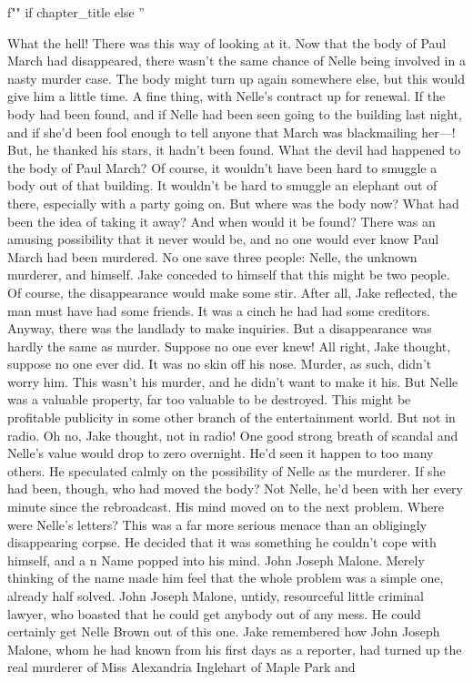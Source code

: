 \documentclass{novel}
\begin{document}
\begin{ChapterStart}
\vspace{3\nbs}
f"" if chapter_title else ''
\end{ChapterStart}

What the hell! There was this way of looking at it. Now that the body of Paul March had disappeared, there wasn’t the same chance of Nelle being involved in a nasty murder case. The body might turn up again somewhere else, but this would give him a little time. A fine thing, with Nelle’s contract up for renewal. If the body had been found, and if Nelle had been seen going to the building last night, and if she’d been fool enough to tell anyone that March was blackmailing her—! But, he thanked his stars, it hadn’t been found. What the devil had happened to the body of Paul March? Of course, it wouldn’t have been hard to smuggle a body out of that building. It wouldn’t be hard to smuggle an elephant out of there, especially with a party going on. But where was the body now? What had been the idea of taking it away? And when would it be found? There was an amusing possibility that it never would be, and no one would ever know Paul March had been murdered. No one save three people: Nelle, the unknown murderer, and himself. Jake conceded to himself that this might be two people. Of course, the disappearance would make some stir. After all, Jake reflected, the man must have had some friends. It was a cinch he had had some creditors. Anyway, there was the landlady to make inquiries. But a disappearance was hardly the same as murder. Suppose no one ever knew! All right, Jake thought, suppose no one ever did. It was no skin off his nose. Murder, as such, didn’t worry him. This wasn’t his murder, and he didn’t want to make it his. But Nelle was a valuable property, far too valuable to be destroyed. This might be profitable publicity in some other branch of the entertainment world. But not in radio. Oh no, Jake thought, not in radio! One good strong breath of scandal and Nelle’s value would drop to zero overnight. He’d seen it happen to too many others. He speculated calmly on the possibility of Nelle as the murderer. If she had been, though, who had moved the body? Not Nelle, he’d been with her every minute since the rebroadcast. His mind moved on to the next problem. Where were Nelle’s letters? This was a far more serious menace than an obligingly disappearing corpse. He decided that it was something he couldn’t cope with himself, and a n Name popped into his mind. John Joseph Malone. Merely thinking of the name made him feel that the whole problem was a simple one, already half solved. John Joseph Malone, untidy, resourceful little criminal lawyer, who boasted that he could get anybody out of any mess. He could certainly get Nelle Brown out of this one. Jake remembered how John Joseph Malone, whom he had known from his first days as a reporter, had turned up the real murderer of Miss Alexandria Inglehart of Maple Park and 
\end{document}

